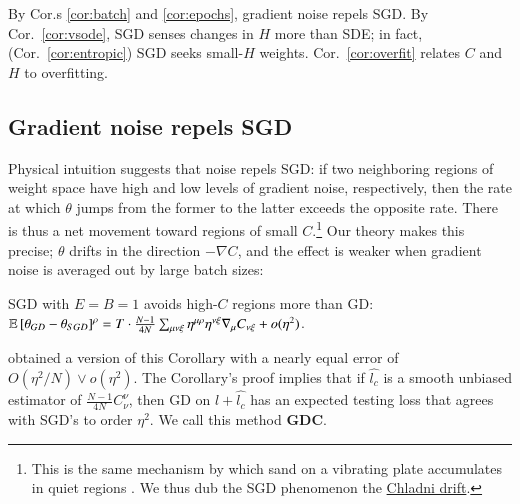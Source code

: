 
        By Cor.s \ref{cor:batch} and \ref{cor:epochs}, gradient noise repels SGD.
        By Cor.\ \ref{cor:vsode}, SGD senses changes in $H$ more than
            SDE; in fact, (Cor.\ \ref{cor:entropic}) SGD seeks small-$H$
            weights.
        Cor.\ \ref{cor:overfit} relates
            $C$ and $H$ to overfitting.

        \subsection{Gradient noise repels SGD}\label{subsect:epochs-batch}
            Physical intuition suggests that noise repels SGD: if two
            neighboring regions of weight space have high and low levels of
            gradient noise, respectively, then
            the rate at which
            $\theta$ jumps from the former to the latter
            exceeds%
            the opposite rate.
            There is thus a net movement toward regions of small $C$.\footnote{
                This is the same mechanism by which sand on a vibrating
                plate accumulates in quiet regions \citep{ch87}.  We thus dub
                the SGD phenomenon the
                \href{http://dataphys.org/list/chladni-plates/}{Chladni
                drift}.
            }
            Our theory makes this precise; $\theta$ drifts in the direction
            $-\nabla C$, and the effect is weaker when gradient noise is
            averaged out by large batch sizes:
            \begin{cor} \label{cor:batch}
                SGD with $E=B=1$ avoids high-$C$ regions more than GD:
                $
                    \mathbb{E}\left[\theta_{GD} - \theta_{SGD}\right]^\rho
                        =
                    T \cdot \frac{N-1}{4 N}
                    \sum_{\mu\nu\xi} \eta^{\mu\rho} \eta^{\nu\xi} \nabla_\mu C_{\nu\xi} + o(\eta^2)
                $.
            \end{cor}
            \noindent
            \cite{ro19} obtained a version of this Corollary with a nearly
            equal error of $O(\eta^2/N)\vee o(\eta^2)$.  The Corollary's proof
            implies that if $\hat{l_c}$ is a
            smooth unbiased estimator of $\frac{N-1}{4 N}
            C^{\nu}_{\nu}$, then GD on $l + \hat{l_c}$ has an expected testing
            loss that agrees with SGD's to order $\eta^2$.  We call this method
            \textbf{GDC}.

